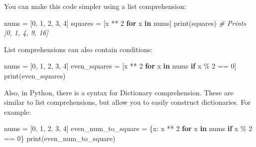 \documentclass[
]{article}
\newenvironment{Shaded}{}{}
\newcommand{\BuiltInTok}[1]{#1}
\newcommand{\CommentTok}[1]{\textcolor[rgb]{0.38,0.63,0.69}{\textit{#1}}}
\newcommand{\ControlFlowTok}[1]{\textcolor[rgb]{0.00,0.44,0.13}{\textbf{#1}}}
\newcommand{\DecValTok}[1]{\textcolor[rgb]{0.25,0.63,0.44}{#1}}
\newcommand{\KeywordTok}[1]{\textcolor[rgb]{0.00,0.44,0.13}{\textbf{#1}}}
\newcommand{\NormalTok}[1]{#1}
\newcommand{\OperatorTok}[1]{\textcolor[rgb]{0.40,0.40,0.40}{#1}}
\begin{document}
You can make this code simpler using a list comprehension:

\begin{Shaded}
\begin{Highlighting}[]
\NormalTok{nums }\OperatorTok{=}\NormalTok{ [}\DecValTok{0}\NormalTok{, }\DecValTok{1}\NormalTok{, }\DecValTok{2}\NormalTok{, }\DecValTok{3}\NormalTok{, }\DecValTok{4}\NormalTok{]}
\NormalTok{squares }\OperatorTok{=}\NormalTok{ [x }\OperatorTok{**} \DecValTok{2} \ControlFlowTok{for}\NormalTok{ x }\KeywordTok{in}\NormalTok{ nums]}
\BuiltInTok{print}\NormalTok{(squares)   }\CommentTok{\# Prints [0, 1, 4, 9, 16]}
\end{Highlighting}
\end{Shaded}

List comprehensions can also contain conditions:

\begin{Shaded}
\begin{Highlighting}[]
\NormalTok{nums }\OperatorTok{=}\NormalTok{ [}\DecValTok{0}\NormalTok{, }\DecValTok{1}\NormalTok{, }\DecValTok{2}\NormalTok{, }\DecValTok{3}\NormalTok{, }\DecValTok{4}\NormalTok{]}
\NormalTok{even\_squares }\OperatorTok{=}\NormalTok{ [x }\OperatorTok{**} \DecValTok{2} \ControlFlowTok{for}\NormalTok{ x }\KeywordTok{in}\NormalTok{ nums }\ControlFlowTok{if}\NormalTok{ x }\OperatorTok{\%} \DecValTok{2} \OperatorTok{==} \DecValTok{0}\NormalTok{]}
\BuiltInTok{print}\NormalTok{(even\_squares)}
\end{Highlighting}
\end{Shaded}

Also, in Python, there is a syntax for Dictionary comprehension. These
are similar to list comprehensions, but allow you to easily construct
dictionaries. For example:

\begin{Shaded}
\begin{Highlighting}[]
\NormalTok{nums }\OperatorTok{=}\NormalTok{ [}\DecValTok{0}\NormalTok{, }\DecValTok{1}\NormalTok{, }\DecValTok{2}\NormalTok{, }\DecValTok{3}\NormalTok{, }\DecValTok{4}\NormalTok{]}
\NormalTok{even\_num\_to\_square }\OperatorTok{=}\NormalTok{ \{x: x }\OperatorTok{**} \DecValTok{2} \ControlFlowTok{for}\NormalTok{ x }\KeywordTok{in}\NormalTok{ nums }\ControlFlowTok{if}\NormalTok{ x }\OperatorTok{\%} \DecValTok{2} \OperatorTok{==} \DecValTok{0}\NormalTok{\}}
\BuiltInTok{print}\NormalTok{(even\_num\_to\_square)}
\end{Highlighting}
\end{Shaded}
\end{document}
